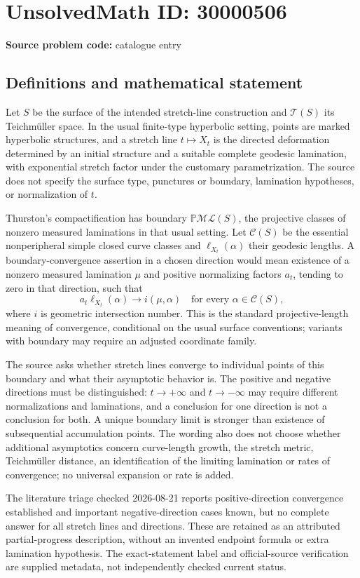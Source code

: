 \documentclass[11pt]{article}
\begin{document}
\section*{UnsolvedMath ID: 30000506}
\textbf{Source problem code:} catalogue entry
\subsection{Definitions and mathematical statement}
Let \(S\) be the surface of the intended stretch-line construction and \(\mathcal T(S)\) its Teichm\"uller space. In the usual finite-type hyperbolic setting, points are marked hyperbolic structures, and a stretch line \(t\mapsto X_t\) is the directed deformation determined by an initial structure and a suitable complete geodesic lamination, with exponential stretch factor under the customary parametrization. The source does not specify the surface type, punctures or boundary, lamination hypotheses, or normalization of \(t\).

Thurston's compactification has boundary \(\mathbb P\mathcal{ML}(S)\), the projective classes of nonzero measured laminations in that usual setting. Let \(\mathcal C(S)\) be the essential nonperipheral simple closed curve classes and \(\ell_{X_t}(\alpha)\) their geodesic lengths. A boundary-convergence assertion in a chosen direction would mean existence of a nonzero measured lamination \(\mu\) and positive normalizing factors \(a_t\), tending to zero in that direction, such that
\[
 a_t\ell_{X_t}(\alpha)\longrightarrow i(\mu,\alpha)
 \quad\text{for every }\alpha\in\mathcal C(S),
\]
where \(i\) is geometric intersection number. This is the standard projective-length meaning of convergence, conditional on the usual surface conventions; variants with boundary may require an adjusted coordinate family.

The source asks whether stretch lines converge to individual points of this boundary and what their asymptotic behavior is. The positive and negative directions must be distinguished: \(t\to+\infty\) and \(t\to-\infty\) may require different normalizations and laminations, and a conclusion for one direction is not a conclusion for both. A unique boundary limit is stronger than existence of subsequential accumulation points. The wording also does not choose whether additional asymptotics concern curve-length growth, the stretch metric, Teichm\"uller distance, an identification of the limiting lamination or rates of convergence; no universal expansion or rate is added.

The literature triage checked 2026-08-21 reports positive-direction convergence established and important negative-direction cases known, but no complete answer for all stretch lines and directions. These are retained as an attributed partial-progress description, without an invented endpoint formula or extra lamination hypothesis. The exact-statement label and official-source verification are supplied metadata, not independently checked current status.
\end{document}
